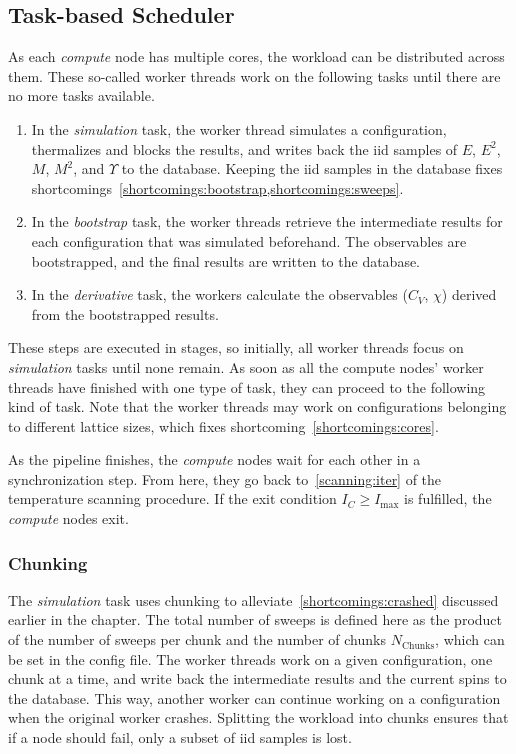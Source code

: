 \subsection{Task-based Scheduler}\label{sec:impl:tasks}
	As each \emph{compute} node has multiple cores, the workload can be distributed across them. These so-called worker threads work on the following tasks until there are no more tasks available.
	\begin{enumerate}
		\item In the \emph{simulation} task, the worker thread simulates a configuration, thermalizes and blocks the results, and writes back the iid samples of $E$, $E^2$, $M$, $M^2$, and $\Upsilon$ to the database. Keeping the iid samples in the database fixes shortcomings~\cref{shortcomings:bootstrap,shortcomings:sweeps}.
		\item In the \emph{bootstrap} task, the worker threads retrieve the intermediate results for each configuration that was simulated beforehand. The observables are bootstrapped, and the final results are written to the database.
		\item In the \emph{derivative} task, the workers calculate the observables ($C_V$, $\chi$) derived from the bootstrapped results.
	\end{enumerate}
	These steps are executed in stages, so initially, all worker threads focus on \emph{simulation} tasks until none remain. As soon as all the compute nodes' worker threads have finished with one type of task, they can proceed to the following kind of task. Note that the worker threads may work on configurations belonging to different lattice sizes, which fixes shortcoming~\cref{shortcomings:cores}.
	
	As the pipeline finishes, the \emph{compute} nodes wait for each other in a synchronization step. From here, they go back to~\cref{scanning:iter} of the temperature scanning procedure. If the exit condition $I_C \ge I_\text{max}$ is fulfilled, the \emph{compute} nodes exit.

	\subsubsection{Chunking}\label{sec:impl:tasks:chunks}
		The \emph{simulation} task uses chunking to alleviate~\cref{shortcomings:crashed} discussed earlier in the chapter. The total number of sweeps is defined here as the product of the number of sweeps per chunk and the number of chunks $N_\text{Chunks}$, which can be set in the config file. The worker threads work on a given configuration, one chunk at a time, and write back the intermediate results and the current spins to the database. This way, another worker can continue working on a configuration when the original worker crashes. Splitting the workload into chunks ensures that if a node should fail, only a subset of iid samples is lost.

